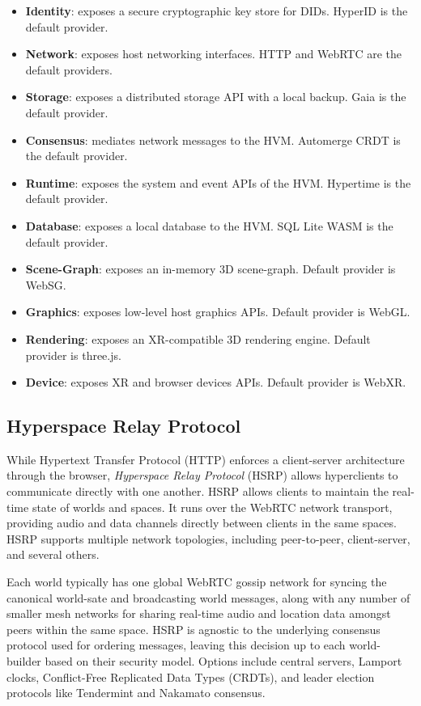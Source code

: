 \documentclass[twocolumn, 10pt]{article}
\begin{document}
\begin{itemize}
    \item \textbf{Identity}: exposes a secure cryptographic key store for DIDs. HyperID is the default provider.
    \item \textbf{Network}: exposes host networking interfaces. HTTP and WebRTC are the default providers.
    \item \textbf{Storage}: exposes a distributed storage API with a local backup. Gaia is the default provider.
    \item \textbf{Consensus}: mediates network messages to the HVM. Automerge CRDT is the default provider.
    \item \textbf{Runtime}: exposes the system and event APIs of the HVM. Hypertime is the default provider.
    \item \textbf{Database}: exposes a local database to the HVM. SQL Lite WASM is the default provider.
    \item \textbf{Scene-Graph}: exposes an in-memory 3D scene-graph. Default provider is WebSG.
    \item \textbf{Graphics}: exposes low-level host graphics APIs. Default provider is WebGL.
    \item \textbf{Rendering}: exposes an XR-compatible 3D rendering engine. Default provider is three.js.
    \item \textbf{Device}: exposes XR and browser devices APIs. Default provider is WebXR.
\end{itemize}

\subsection{Hyperspace Relay Protocol}

 While Hypertext Transfer Protocol (HTTP) enforces a client-server architecture through the browser, \textit{Hyperspace Relay Protocol} (HSRP) allows hyperclients to communicate directly with one another. HSRP allows clients to maintain the real-time state of worlds and spaces. It runs over the WebRTC network transport, providing audio and data channels directly between clients in the same spaces. HSRP supports multiple network topologies, including peer-to-peer, client-server, and several others. 
 
 Each world typically has one global WebRTC gossip network for syncing the canonical world-sate and broadcasting world messages, along with any number of smaller mesh networks for sharing real-time audio and location data amongst peers within the same space. HSRP is agnostic to the underlying consensus protocol used for ordering messages, leaving this decision up to each world-builder based on their security model. Options include central servers, Lamport clocks, Conflict-Free Replicated Data Types (CRDTs), and leader election protocols like Tendermint and Nakamato consensus.
\end{document}
